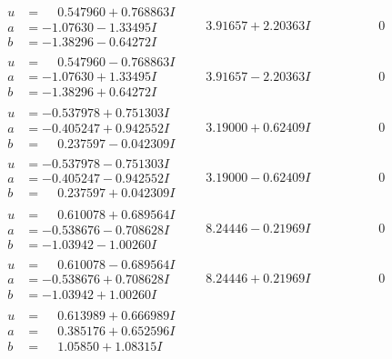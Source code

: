 \documentclass[1p]{elsarticle_modified}
\theoremstyle{definition}
\begin{document}
$$\begin{array}{c|c|c}
\begin{aligned}
u &= \phantom{-}0.547960 + 0.768863 I \\
a &= -1.07630 - 1.33495 I \\
b &= -1.38296 - 0.64272 I\end{aligned}
 & \phantom{-}3.91657 + 2.20363 I & \phantom{-0.000000 } 0 \\ \hline\begin{aligned}
u &= \phantom{-}0.547960 - 0.768863 I \\
a &= -1.07630 + 1.33495 I \\
b &= -1.38296 + 0.64272 I\end{aligned}
 & \phantom{-}3.91657 - 2.20363 I & \phantom{-0.000000 } 0 \\ \hline\begin{aligned}
u &= -0.537978 + 0.751303 I \\
a &= -0.405247 + 0.942552 I \\
b &= \phantom{-}0.237597 - 0.042309 I\end{aligned}
 & \phantom{-}3.19000 + 0.62409 I & \phantom{-0.000000 } 0 \\ \hline\begin{aligned}
u &= -0.537978 - 0.751303 I \\
a &= -0.405247 - 0.942552 I \\
b &= \phantom{-}0.237597 + 0.042309 I\end{aligned}
 & \phantom{-}3.19000 - 0.62409 I & \phantom{-0.000000 } 0 \\ \hline\begin{aligned}
u &= \phantom{-}0.610078 + 0.689564 I \\
a &= -0.538676 - 0.708628 I \\
b &= -1.03942 - 1.00260 I\end{aligned}
 & \phantom{-}8.24446 - 0.21969 I & \phantom{-0.000000 } 0 \\ \hline\begin{aligned}
u &= \phantom{-}0.610078 - 0.689564 I \\
a &= -0.538676 + 0.708628 I \\
b &= -1.03942 + 1.00260 I\end{aligned}
 & \phantom{-}8.24446 + 0.21969 I & \phantom{-0.000000 } 0 \\ \hline\begin{aligned}
u &= \phantom{-}0.613989 + 0.666989 I \\
a &= \phantom{-}0.385176 + 0.652596 I \\
b &= \phantom{-}1.05850 + 1.08315 I\end{aligned}

\end{array}$$
\end{document}

